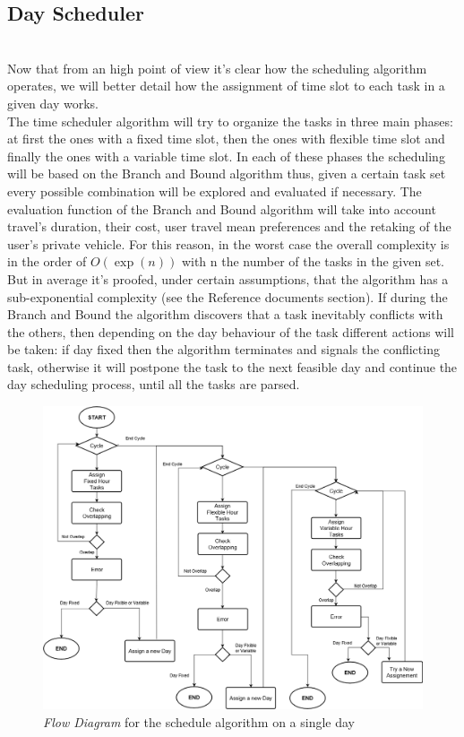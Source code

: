   

\subsection{Day Scheduler}
\\Now that from an high point of view it's clear how the scheduling algorithm operates, we will better detail how the assignment of time slot to each task in a given day works.
\\The time scheduler algorithm will try to organize the tasks in three main phases: at first the ones with a fixed time slot, then the ones with flexible time slot and finally the ones with a variable time slot.
In each of these phases the scheduling will be based on the Branch and Bound algorithm thus, given a certain task set every possible combination will be explored and evaluated if necessary. The evaluation function of the Branch and Bound algorithm will take into account travel's duration, their cost, user travel mean preferences and the retaking of the user's private vehicle. For this reason, in the worst case the overall complexity is in the order of $O(\exp(n))$ with n the number of the tasks in the given set. But in average it's proofed, under certain assumptions, that the algorithm has a sub-exponential complexity (see the Reference documents section). 
If during the Branch and Bound the algorithm discovers that a task inevitably conflicts with the others, then depending on the day behaviour of the task different actions will be taken: if day fixed then the algorithm terminates and signals the conflicting task, otherwise it will postpone the task to the next feasible day and continue the day scheduling process, until all the tasks are parsed.


\begin{figure}[H]
    \centering
    \includegraphics[scale=0.36]{Pictures/FlowDiagram/Algorithm.png}
    \caption{\emph{Flow Diagram} for the schedule algorithm on a single day}
    \label{fig:singleDayAlg}
\end{figure}

